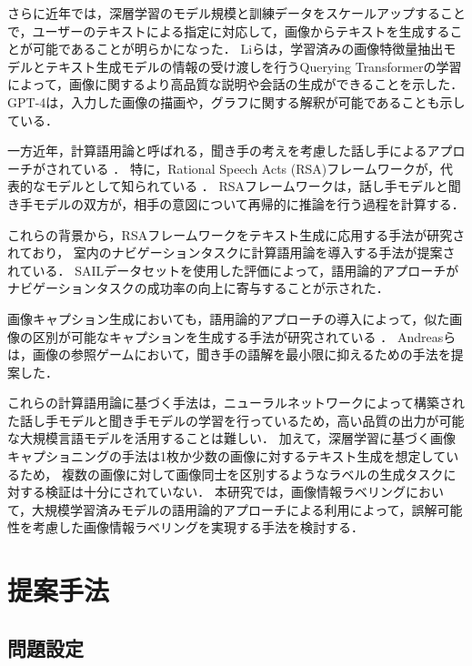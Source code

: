 \documentclass[a4paper,11pt]{jreport}
\begin{document}
さらに近年では，深層学習のモデル規模と訓練データをスケールアップすることで，ユーザーのテキストによる指定に対応して，画像からテキストを生成することが可能であることが明らかになった．
Liら\cite{Li2023}は，学習済みの画像特徴量抽出モデルとテキスト生成モデルの情報の受け渡しを行うQuerying Transformerの学習によって，画像に関するより高品質な説明や会話の生成ができることを示した．
GPT-4\cite{Bubeck2023}は，入力した画像の描画や，グラフに関する解釈が可能であることも示している．

一方近年，計算語用論と呼ばれる，聞き手の考えを考慮した話し手によるアプローチがされている \cite{Fried2023}．
特に，Rational Speech Acts (RSA)フレームワークが，代表的なモデルとして知られている \cite{Frank2012,Goodman2016}．
RSAフレームワークは，話し手モデルと聞き手モデルの双方が，相手の意図について再帰的に推論を行う過程を計算する．

これらの背景から，RSAフレームワークをテキスト生成に応用する手法が研究されており\cite{Fried2017}，
室内のナビゲーションタスクに計算語用論を導入する手法が提案されている\cite{Williams2015}．
SAILデータセットを使用した評価によって，語用論的アプローチがナビゲーションタスクの成功率の向上に寄与することが示された．

画像キャプション生成においても，語用論的アプローチの導入によって，似た画像の区別が可能なキャプションを生成する手法が研究されている \cite{Vedantam2017,Cohn-Gordon2018,Nie2020}．
Andreasら\cite{Andreas2016}は，画像の参照ゲームにおいて，聞き手の語解を最小限に抑えるための手法を提案した．

これらの計算語用論に基づく手法は，ニューラルネットワークによって構築された話し手モデルと聞き手モデルの学習を行っているため，高い品質の出力が可能な大規模言語モデルを活用することは難しい．
加えて，深層学習に基づく画像キャプショニングの手法は1枚か少数の画像に対するテキスト生成を想定しているため，
複数の画像に対して画像同士を区別するようなラベルの生成タスクに対する検証は十分にされていない．
本研究では，画像情報ラベリングにおいて，大規模学習済みモデルの語用論的アプローチによる利用によって，誤解可能性を考慮した画像情報ラベリングを実現する手法を検討する．

\chapter{提案手法}

\section{問題設定}
\end{document}
